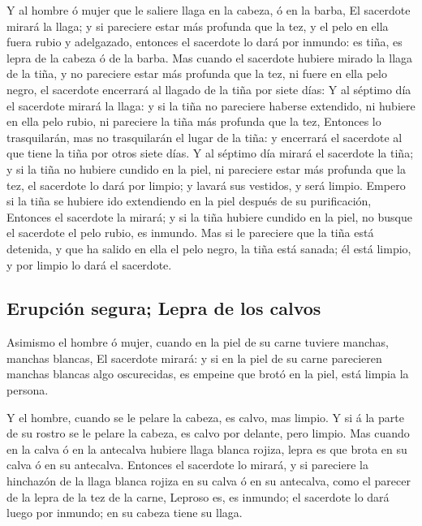  Y al hombre ó mujer que le saliere llaga en la cabeza, ó
en la barba,  El sacerdote mirará la llaga; y si pareciere
estar más profunda que la tez, y el pelo en ella fuera rubio y
adelgazado, entonces el sacerdote lo dará por inmundo: es tiña, es lepra
de la cabeza ó de la barba.  Mas cuando el sacerdote
hubiere mirado la llaga de la tiña, y no pareciere estar más profunda
que la tez, ni fuere en ella pelo negro, el sacerdote encerrará al
llagado de la tiña por siete días:  Y al séptimo día el
sacerdote mirará la llaga: y si la tiña no pareciere haberse extendido,
ni hubiere en ella pelo rubio, ni pareciere la tiña más profunda que la
tez,  Entonces lo trasquilarán, mas no trasquilarán el
lugar de la tiña: y encerrará el sacerdote al que tiene la tiña por
otros siete días.  Y al séptimo día mirará el sacerdote la
tiña; y si la tiña no hubiere cundido en la piel, ni pareciere estar más
profunda que la tez, el sacerdote lo dará por limpio; y lavará sus
vestidos, y será limpio.  Empero si la tiña se hubiere ido
extendiendo en la piel después de su purificación, 
Entonces el sacerdote la mirará; y si la tiña hubiere cundido en la
piel, no busque el sacerdote el pelo rubio, es inmundo. 
Mas si le pareciere que la tiña está detenida, y que ha salido en ella
el pelo negro, la tiña está sanada; él está limpio, y por limpio lo dará
el sacerdote.

\hypertarget{erupciuxf3n-segura-lepra-de-los-calvos}{%
\subsection{Erupción segura; Lepra de los
calvos}\label{erupciuxf3n-segura-lepra-de-los-calvos}}

 Asimismo el hombre ó mujer, cuando en la piel de su carne
tuviere manchas, manchas blancas,  El sacerdote mirará: y
si en la piel de su carne parecieren manchas blancas algo oscurecidas,
es empeine que brotó en la piel, está limpia la persona.

 Y el hombre, cuando se le pelare la cabeza, es calvo, mas
limpio.  Y si á la parte de su rostro se le pelare la
cabeza, es calvo por delante, pero limpio.  Mas cuando en
la calva ó en la antecalva hubiere llaga blanca rojiza, lepra es que
brota en su calva ó en su antecalva.  Entonces el sacerdote
lo mirará, y si pareciere la hinchazón de la llaga blanca rojiza en su
calva ó en su antecalva, como el parecer de la lepra de la tez de la
carne,  Leproso es, es inmundo; el sacerdote lo dará luego
por inmundo; en su cabeza tiene su llaga.

